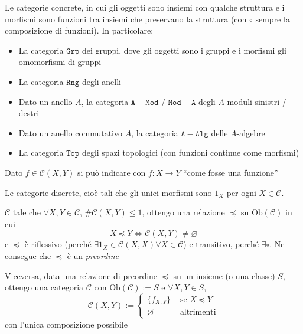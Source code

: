 \begin{example}{}
    Le categorie concrete, in cui gli oggetti sono insiemi con qualche struttura
    e i morfismi sono funzioni tra insiemi che preservano la struttura (con \(\circ\) sempre la composizione di funzioni). In particolare:
\begin{itemize}
    \item La categoria \(\mathtt{Grp}\) dei gruppi, dove gli oggetti sono i
        gruppi e i morfismi gli omomorfismi di gruppi
    \item La categoria \(\mathtt{Rng}\) degli anelli
    \item Dato un anello \(A\), la categoria \(\mathtt{A-Mod}\) / \(\mathtt{Mod-A}\) degli \(A\)-moduli sinistri / destri
    \item Dato un anello commutativo \(A\), la categoria \(\mathtt{A-Alg}\)
        delle \(A\)-algebre
    \item La categoria \(\mathtt{Top}\) degli spazi topologici (con funzioni
        continue come morfismi)
\end{itemize}
\end{example}
\begin{note}{}
    Dato \(f \in \mathcal{C}{(X, Y)}\) si può indicare con \(f : X \to Y\) ``come fosse
    una funzione''
\end{note}

\begin{example}{}
    Le categorie discrete, cioè tali che gli unici morfismi sono \(1_X\) per
    ogni \(X \in \mathcal{C}\).
\end{example}

\begin{example}{}
    \(\mathcal{C}\) tale che \(\forall X, Y \in \mathcal{C}\), \(\# \mathcal{C} {(X, Y)} \le 1\), ottengo
    una relazione \(\preccurlyeq \) su \(\mathrm{Ob}{(\mathcal{C})}\) in cui
    \[
      X \preccurlyeq Y \iff \mathcal{C}{(X, Y)} \neq \varnothing
    \]
    e \(\preccurlyeq\)  è riflessivo (perché \(\exists  1_X \in \mathcal{C}{(X, X)} \forall X \in \mathcal{C}\)) e transitivo, perché \(\exists \circ\). Ne consegue che \(\preccurlyeq\) è un \emph{preordine}

    Viceversa, data una relazione di preordine \(\preccurlyeq\) su un insieme (o
    una classe) \(S\), ottengo una categoria \(\mathcal{C}\) con \(\mathrm{Ob}{(\mathcal{C})} := S\) e \(\forall X, Y \in S\), 
    \[
      \mathcal{C}{(X, Y)} := \begin{cases}{}
          \{f_{X,Y} \} & \text{ se } X \preccurlyeq Y \\
          \varnothing & \text{ altrimenti}
      \end{cases}
    \]
    con l'unica composizione possibile
\end{example}

